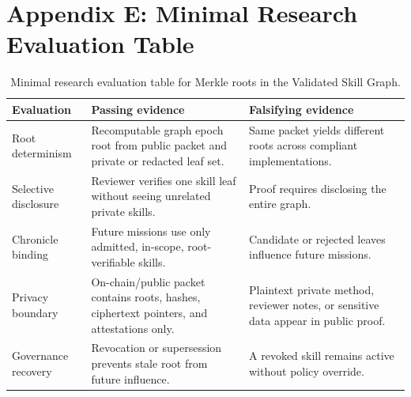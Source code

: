 \documentclass[11pt,letterpaper]{article}
\begin{document}
\section*{Appendix E: Minimal Research Evaluation Table}
\begin{table}[H]
\small
\centering
\begin{tabularx}{\textwidth}{p{1.55in}Y Y}
\toprule
Evaluation & Passing evidence & Falsifying evidence\\
\midrule
Root determinism & Recomputable graph epoch root from public packet and private or redacted leaf set. & Same packet yields different roots across compliant implementations.\\
Selective disclosure & Reviewer verifies one skill leaf without seeing unrelated private skills. & Proof requires disclosing the entire graph.\\
Chronicle binding & Future missions use only admitted, in-scope, root-verifiable skills. & Candidate or rejected leaves influence future missions.\\
Privacy boundary & On-chain/public packet contains roots, hashes, ciphertext pointers, and attestations only. & Plaintext private method, reviewer notes, or sensitive data appear in public proof.\\
Governance recovery & Revocation or supersession prevents stale root from future influence. & A revoked skill remains active without policy override.\\
\bottomrule
\end{tabularx}
\caption{Minimal research evaluation table for Merkle roots in the Validated Skill Graph.}
\end{table}
\end{document}
